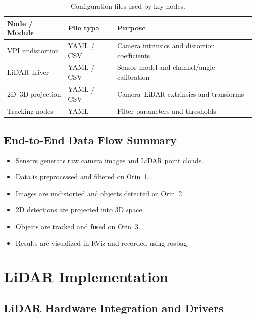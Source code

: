 \documentclass[12pt,a4paper]{report}
\begin{document}
\begin{table}[H]
\centering
\caption[Configuration files]{Configuration files used by key nodes.}
\label{tab:config-files}
\begin{tabularx}{\textwidth}{@{}l l X@{}}
\toprule
\textbf{Node / Module} & \textbf{File type} & \textbf{Purpose} \\
\midrule
VPI undistortion & YAML / CSV & Camera intrinsics and distortion coefficients \\
LiDAR driver & YAML / CSV & Sensor model and channel/angle calibration \\
2D--3D projection & YAML / CSV & Camera--LiDAR extrinsics and transforms \\
Tracking nodes & YAML & Filter parameters and thresholds \\
\bottomrule
\end{tabularx}
\end{table}

\section{End-to-End Data Flow Summary}
\begin{itemize}
    \item Sensors generate raw camera images and LiDAR point clouds.
    \item Data is preprocessed and filtered on Orin~1.
    \item Images are undistorted and objects detected on Orin~2.
    \item 2D detections are projected into 3D space.
    \item Objects are tracked and fused on Orin~3.
    \item Results are visualized in RViz and recorded using rosbag.
\end{itemize}

\chapter{LiDAR Implementation}



\section[LiDAR Integration]{LiDAR Hardware Integration and Drivers}
\end{document}
